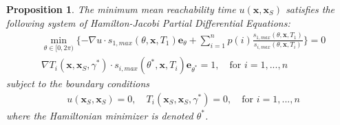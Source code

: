 \documentclass[pdflatex,sn-mathphys-num]{sn-jnl}%
\def \bx{{\mathbf {x}}}
\def \be{{\mathbf {e}}}
\theoremstyle{thmstyleone}%
\newtheorem{proposition}[theorem]{Proposition}%
\theoremstyle{thmstyletwo}%
\theoremstyle{thmstylethree}%
\begin{document}
\begin{proposition}
The minimum mean reachability time $u(\bx,\bx_S)$ satisfies the following system of Hamilton-Jacobi Partial Differential Equations:
\begin{align}
    & \min_{\theta \in  [0, 2\pi)} \{ -\nabla u \cdot s_{1,max} (\theta, \bx, T_1) \be_\theta + \sum_{i=1}^{n} p(i) \frac{s_{1,max} (\theta, \bx, T_1)}{s_{i,max} (\theta, \bx, T_i)} \} = 0 \label{eqn:unc-hj}\\
    & \nabla T_i(\bx, \bx_S,\gamma^*) \cdot s_{i,max}(\theta^*,\bx, T_i)\be_{\theta^*} = 1 , \quad \text{for } i=1,...,n
    \label{eqn:det-hj}
\end{align}
subject to the boundary conditions
\begin{align}
    & u(\bx_S, \bx_S) = 0 , \quad T_i(\bx_S, \bx_S, \gamma^*) = 0, \quad \text{for } i=1,...,n \label{eqn:bc-hj}
\end{align}
where the Hamiltonian minimizer is denoted $\theta^*$.
\end{proposition}
\end{document}

